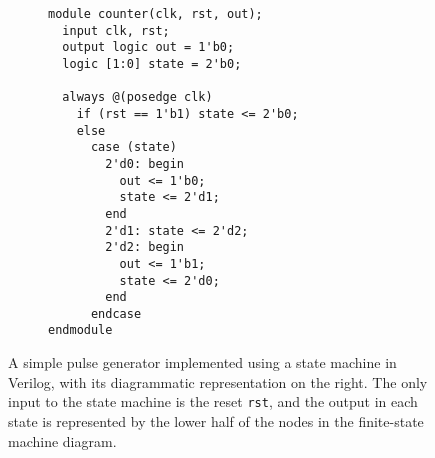 \begin{figure}
  \centering
  \begin{subfigure}{0.4\linewidth}
\begin{verbatim}
module counter(clk, rst, out);
  input clk, rst;
  output logic out = 1'b0;
  logic [1:0] state = 2'b0;

  always @(posedge clk)
    if (rst == 1'b1) state <= 2'b0;
    else
      case (state)
        2'd0: begin
          out <= 1'b0;
          state <= 2'd1;
        end
        2'd1: state <= 2'd2;
        2'd2: begin
          out <= 1'b1;
          state <= 2'd0;
        end
      endcase
endmodule
\end{verbatim}
  \end{subfigure}\hfill%
  \begin{subfigure}{0.6\linewidth}
    \centering
  \end{subfigure}
  \caption[A simple Verilog implementation of a finite-state machine.]{A simple
    pulse generator implemented using a state machine in Verilog, with its
    diagrammatic representation on the right.  The only input to the state
    machine is the reset \texttt{rst}, and the output in each state is represented
    by the lower half of the nodes in the finite-state machine diagram.}%
  \label{fig:tutorial:state_machine}
\end{figure}



